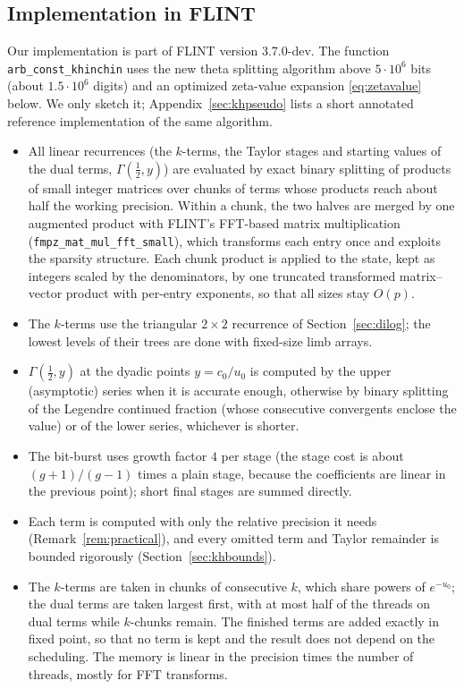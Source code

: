 \documentclass[11pt,reqno]{amsart}
\theoremstyle{definition}
\theoremstyle{remark}
\begin{document}
\subsection{Implementation in FLINT}\label{sec:khimpl}
Our implementation is part of FLINT \cite{FLINT} version 3.7.0-dev.
The function \texttt{arb\_const\_khinchin} uses the new theta splitting algorithm above
$5\cdot10^6$ bits (about $1.5\cdot10^6$ digits) and an optimized zeta-value expansion \eqref{eq:zetavalue} below.
We only sketch it; Appendix~\ref{sec:khpseudo} lists a short annotated reference implementation of the same
algorithm.
\begin{itemize}
\item All linear recurrences (the $k$-terms, the Taylor stages and starting values of the dual terms,
$\Gamma(\frac12, y)$) are evaluated by exact binary splitting of products of small integer matrices over chunks of
terms whose products reach about half the working precision. Within a chunk, the two halves are merged by one
augmented product with FLINT's FFT-based matrix multiplication (\texttt{fmpz\_mat\_mul\_fft\_small}), which
transforms each entry once and exploits the sparsity structure.
Each chunk product is applied to the state, kept as integers scaled by the denominators,
by one truncated transformed matrix--vector product with per-entry exponents, so that all sizes stay $O(p)$.
\item The $k$-terms use the triangular $2\times2$ recurrence of Section~\ref{sec:dilog}; the lowest levels of their trees are done with
fixed-size limb arrays.
\item $\Gamma(\frac12, y)$ at the dyadic points $y = c_0/u_0$ is computed by the upper (asymptotic) series when it is
accurate enough, otherwise by binary splitting of the Legendre continued fraction (whose consecutive convergents
enclose the value) or of the lower series, whichever is shorter.
\item The bit-burst uses growth factor $4$ per stage (the stage cost is about $(g+1)/(g-1)$ times a plain stage,
because the coefficients are linear in the previous point); short final stages are summed directly.
\item Each term is computed with only the relative precision it needs (Remark~\ref{rem:practical}), and every omitted
term and Taylor remainder is bounded rigorously (Section~\ref{sec:khbounds}).
\item The $k$-terms are taken in chunks of consecutive $k$, which share powers of $e^{-u_0}$; the dual terms are taken
largest first, with at most half of the threads on dual terms while $k$-chunks remain. The finished terms are added
exactly in fixed point, so that no term is kept and the result does not depend on the scheduling. The memory is linear
in the precision times the number of threads, mostly for FFT transforms.
\end{itemize}
\end{document}

